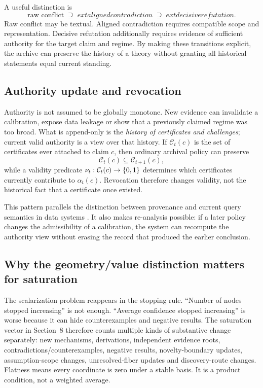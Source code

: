 A useful distinction is
\[
\text{raw conflict}\;\supseteq\;	ext{aligned contradiction}\;\supseteq\;	ext{decisive refutation}.
\]
Raw conflict may be textual. Aligned contradiction requires compatible scope and representation. Decisive refutation additionally requires evidence of sufficient authority for the target claim and regime. By making these transitions explicit, the archive can preserve the history of a theory without granting all historical statements equal current standing.

\subsection{Authority update and revocation}

Authority is not assumed to be globally monotone. New evidence can invalidate a calibration, expose data leakage or show that a previously claimed regime was too broad. What is append-only is the \emph{history of certificates and challenges}; current valid authority is a view over that history. If \(\mathcal C_t(c)\) is the set of certificates ever attached to claim \(c\), then ordinary archival policy can preserve
\[
\mathcal C_t(c)\subseteq \mathcal C_{t+1}(c),
\]
while a validity predicate \(\nu_t:\mathcal C_t(c)\to\{0,1\}\) determines which certificates currently contribute to \(\alpha_t(c)\). Revocation therefore changes validity, not the historical fact that a certificate once existed.

This pattern parallels the distinction between provenance and current query semantics in data systems \cite{buneman2001,green2007,prov2013}. It also makes re-analysis possible: if a later policy changes the admissibility of a calibration, the system can recompute the authority view without erasing the record that produced the earlier conclusion.

\subsection{Why the geometry/value distinction matters for saturation}

The scalarization problem reappears in the stopping rule. ``Number of nodes stopped increasing'' is not enough. ``Average confidence stopped increasing'' is worse because it can hide counterexamples and negative results. The saturation vector in Section~8 therefore counts multiple kinds of substantive change separately: new mechanisms, derivations, independent evidence roots, contradictions/counterexamples, negative results, novelty-boundary updates, assumption-scope changes, unresolved-fiber updates and discovery-route changes. Flatness means every coordinate is zero under a stable basis. It is a product condition, not a weighted average.
